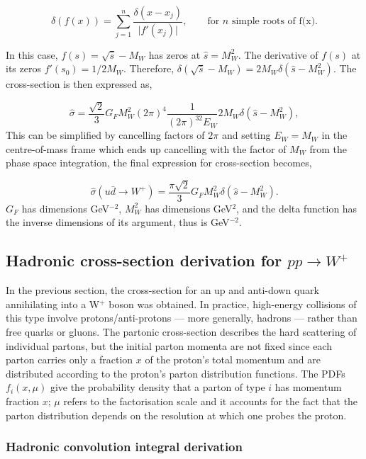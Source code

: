 \documentclass[a4paper,11pt]{article}
\begin{document}
\begin{equation}\label{delta-fn-scaling-property}
\delta(f(x))
=
\sum_{j=1}^{n}
\frac{\delta(x-x_j)}{\bigl| f'(x_j) \bigr|},
\qquad
\text{for $n$ simple roots of f(x)}.
\end{equation}

In this case, $f(s) = \sqrt{\hat{s}} - M_W $ has zeros at $\hat{s}= M_W^2$. The derivative of $f(s)$ at its zeros $f'(s_0) = 1/2M_W$. Therefore,  $\delta(\sqrt{\hat{s}} - M_W) = 2M_W\delta(\hat{s} - M_W^2)$. The cross-section is then expressed as,

$$\hat{\sigma} =\frac{\sqrt{2}}{3}G_FM^2_W(2\pi)^4\frac{1}{(2\pi)^32E_W}2M_W\delta(\hat{s} - M_W^2), $$
This can be simplified by cancelling factors of $2\pi$ and setting $E_W = M_W$  in the centre-of-mass frame which ends up cancelling with the factor of $M_W$ from the phase space integration, the final expression for cross-section becomes,

\begin{equation}
	\hat{\sigma} (u\bar{d} \rightarrow W^+) =\frac{\pi \sqrt{2}}{3}G_FM^2_W\delta(\hat{s} - M_W^2).
\end{equation}
$G_F$ has dimensions GeV$^{-2}$, $M^2_W$ has dimensions GeV$^2$, and the delta function has the inverse dimensions of its argument, thus is GeV$^{-2}$. 

\subsection{Hadronic cross-section derivation for $pp \rightarrow W^+$}\label{had-crosssec-sec}
In the previous section, the cross-section for an up and anti-down quark annihilating into a W$^+$ boson was obtained. In practice, high-energy collisions of this type involve protons/anti-protons --- more generally, hadrons --- rather than free quarks or gluons. The partonic cross-section describes the hard scattering of individual partons, but the initial parton momenta are not fixed since each parton carries only a fraction $x$ of the proton’s total momentum and are distributed according to the proton’s parton distribution functions. The PDFs $f_i(x, \mu)$ give the probability density that a parton of type $i$ has momentum fraction $x$; $\mu$ refers to the factorisation scale and it accounts for the fact that the parton distribution depends on the resolution at which one probes the proton. 
\subsubsection{Hadronic convolution integral derivation}
\end{document}
